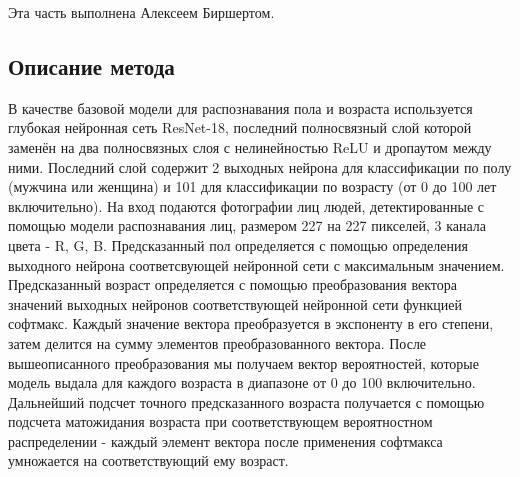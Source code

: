 Эта часть выполнена Алексеем Биршертом. \\
\subsection*{Описание метода}
В качестве базовой модели для распознавания пола и возраста используется глубокая нейронная сеть ResNet-18, последний полносвязный слой которой заменён на два полносвязных слоя с нелинейностью ReLU и дропаутом между ними.
Последний слой содержит 2 выходных нейрона для классификации по полу (мужчина или женщина) и 101 для классификации по возрасту (от 0 до 100 лет включительно).
На вход подаются фотографии лиц людей, детектированные с помощью модели распознавания лиц, размером 227 на 227 пикселей, 3 канала цвета - R, G, B\@.
Предсказанный пол определяется с помощью определения выходного нейрона соответсвующей нейронной сети с максимальным значением.
Предсказанный возраст определяется с помощью преобразования вектора значений выходных нейронов соответствующей нейронной сети функцией софтмакс.
Каждый значение вектора преобразуется в экспоненту в его степени, затем делится на сумму элементов преобразованного вектора.
После вышеописанного преобразования мы получаем вектор вероятностей, которые модель выдала для каждого возраста в диапазоне от 0 до 100 включительно.
Дальнейший подсчет точного предсказанного возраста получается с помощью подсчета матожидания возраста при соответствующем вероятностном распределении - каждый элемент вектора после применения софтмакса умножается на соответствующий ему возраст.

